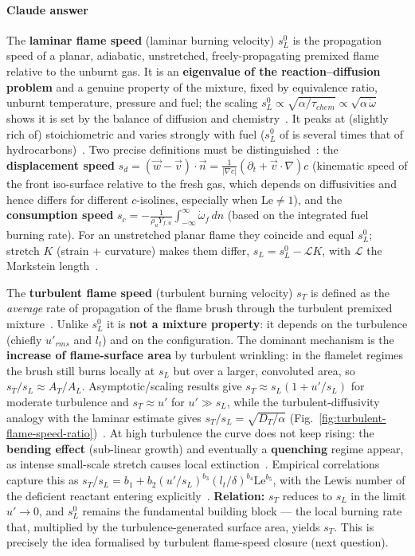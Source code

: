 {\color{istblue}
\paragraph{Claude answer}
The \textbf{laminar flame speed} (laminar burning velocity) $s_L^0$ is the propagation speed of a planar, adiabatic, unstretched, freely-propagating premixed flame relative to the unburnt gas. It is an \textbf{eigenvalue of the reaction--diffusion problem} and a genuine property of the mixture, fixed by equivalence ratio, unburnt temperature, pressure and fuel; the scaling $s_L^0 \propto \sqrt{\alpha/\tau_{chem}} \propto \sqrt{\alpha\,\dot\omega}$ shows it is set by the balance of diffusion and chemistry~\cite{lecture9,warnatz2006combustion}. It peaks at (slightly rich of) stoichiometric and varies strongly with fuel ($s_L^0$ of  is several times that of hydrocarbons)~\cite{lecture9}. Two precise definitions must be distinguished~\cite{lecture9}: the \textbf{displacement speed} $s_d = (\vec w - \vec v)\cdot \vec n = \tfrac{1}{|\nabla c|}(\partial_t + \vec v\cdot\nabla)c$ (kinematic speed of the front iso-surface relative to the fresh gas, which depends on diffusivities and hence differs for different $c$-isolines, especially when $\mathrm{Le}\neq1$), and the \textbf{consumption speed} $s_c = -\tfrac{1}{\rho_u Y_{f,u}}\int_{-\infty}^{\infty}\dot\omega_f\,dn$ (based on the integrated fuel burning rate). For an unstretched planar flame they coincide and equal $s_L^0$; stretch $K$ (strain $+$ curvature) makes them differ, $s_L = s_L^0 - \mathcal{L}K$, with $\mathcal{L}$ the Markstein length~\cite{Law1988,lecture9}.

The \textbf{turbulent flame speed} (turbulent burning velocity) $s_T$ is defined as the \emph{average} rate of propagation of the flame brush through the turbulent premixed mixture~\cite{lecture9,warnatz2006combustion}. Unlike $s_L^0$ it is \textbf{not a mixture property}: it depends on the turbulence (chiefly $u'_{rms}$ and $l_t$) and on the configuration. The dominant mechanism is the \textbf{increase of flame-surface area} by turbulent wrinkling: in the flamelet regimes the brush still burns locally at $s_L$ but over a larger, convoluted area, so $s_T/s_L \approx A_T/A_L$. Asymptotic/scaling results give $s_T \approx s_L(1 + u'/s_L)$ for moderate turbulence and $s_T \approx u'$ for $u'\gg s_L$, while the turbulent-diffusivity analogy with the laminar estimate gives $s_T/s_L = \sqrt{D_T/\alpha}$ (Fig.~\ref{fig:turbulent-flame-speed-ratio})~\cite{lecture9}. At high turbulence the curve does not keep rising: the \textbf{bending effect} (sub-linear growth) and eventually a \textbf{quenching} regime appear, as intense small-scale stretch causes local extinction~\cite{warnatz2006combustion}. Empirical correlations capture this as $s_T/s_L = b_1 + b_2 (u'/s_L)^{b_3}(l_t/\delta)^{b_4}\mathrm{Le}^{b_5}$, with the Lewis number of the deficient reactant entering explicitly~\cite{ciccarelli2008flame}. \textbf{Relation:} $s_T$ reduces to $s_L$ in the limit $u'\to 0$, and $s_L^0$ remains the fundamental building block --- the local burning rate that, multiplied by the turbulence-generated surface area, yields $s_T$. This is precisely the idea formalised by turbulent flame-speed closure (next question).
}



